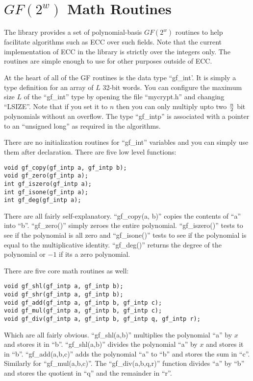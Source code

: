 \documentclass{book}
\begin{document}
\chapter{$GF(2^w)$ Math Routines}

The library provides a set of polynomial-basis $GF(2^w)$ routines to help facilitate algorithms such as ECC over such
fields.  Note that the current implementation of ECC in the library is strictly over the integers only.  The routines
are simple enough to use for other purposes outside of ECC.  

At the heart of all of the GF routines is the data type ``gf\_int'.  It is simply a type definition for an array of 
$L$ 32-bit words.  You can configure the maximum size $L$ of the ``gf\_int'' type by opening the file ``mycrypt.h'' and 
changing ``LSIZE''.  Note that if you set it to $n$ then you can only multiply upto two $n \over 2$ bit polynomials without
an overflow.  The type ``gf\_intp'' is associated with a pointer to an ``unsigned long'' as required in the algorithms.

There are no initialization routines for ``gf\_int'' variables and you can simply use them after declaration.  There are five
low level functions:
    
\begin{verbatim}
void gf_copy(gf_intp a, gf_intp b);
void gf_zero(gf_intp a);
int gf_iszero(gf_intp a);
int gf_isone(gf_intp a);
int gf_deg(gf_intp a);
\end{verbatim}
There are all fairly self-explanatory.  ``gf\_copy(a, b)'' copies the contents of ``a'' into ``b''.  ``gf\_zero()'' simply
zeroes the entire polynomial.  ``gf\_iszero()'' tests to see if the polynomial is all zero and ``gf\_isone()'' tests to see
if the polynomial is equal to the multiplicative identity.  ``gf\_deg()'' returns the degree of the polynomial or $-1$ if its
a zero polynomial.

There are five core math routines as well:
     
\begin{verbatim}
void gf_shl(gf_intp a, gf_intp b);
void gf_shr(gf_intp a, gf_intp b);
void gf_add(gf_intp a, gf_intp b, gf_intp c);
void gf_mul(gf_intp a, gf_intp b, gf_intp c);
void gf_div(gf_intp a, gf_intp b, gf_intp q, gf_intp r);
\end{verbatim}

Which are all fairly obvious.  ``gf\_shl(a,b)'' multiplies the polynomial ``a'' by $x$ and stores it in ``b''.  
``gf\_shl(a,b)'' divides the polynomial ``a'' by $x$ and stores it in ``b''.  ``gf\_add(a,b,c)'' adds the polynomial
``a'' to ``b'' and stores the sum in ``c''.  Similarly for ``gf\_mul(a,b,c)''.  The ``gf\_div(a,b,q,r)'' function divides
``a'' by ``b'' and stores the quotient in ``q'' and the remainder in ``r''.
\end{document}
